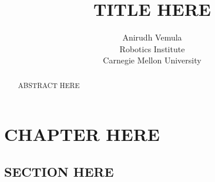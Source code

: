 \documentclass[12pt]{report}
\title{%
\textbf{TITLE HERE}
}
\author{
  Anirudh Vemula \\
  Robotics Institute \\
  Carnegie Mellon University
}
\begin{document}
\maketitle
\bigskip

\begin{abstract}
  ABSTRACT HERE
\end{abstract}


\clearpage

\tableofcontents

\clearpage

\chapter{CHAPTER HERE}
\label{cha:chapter-here}

\section{SECTION HERE}
\label{sec:section-here}


%

\clearpage




\clearpage
\appendix

%
\end{document}

